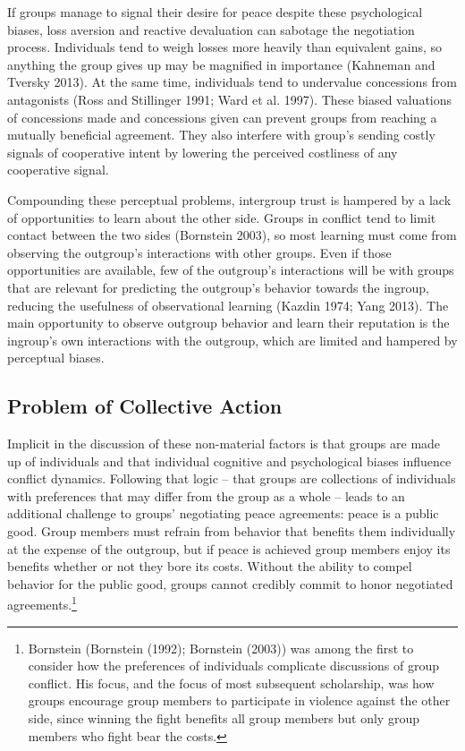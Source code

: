 \documentclass[11pt]{article}
\begin{document}
If groups manage to signal their desire for peace despite these
psychological biases, loss aversion and reactive devaluation can
sabotage the negotiation process. Individuals tend to weigh losses more
heavily than equivalent gains, so anything the group gives up may be
magnified in importance (Kahneman and Tversky 2013). At the same time,
individuals tend to undervalue concessions from antagonists (Ross and
Stillinger 1991; Ward et al. 1997). These biased valuations of
concessions made and concessions given can prevent groups from reaching
a mutually beneficial agreement. They also interfere with group's
sending costly signals of cooperative intent by lowering the perceived
costliness of any cooperative signal.

Compounding these perceptual problems, intergroup trust is hampered by a
lack of opportunities to learn about the other side. Groups in conflict
tend to limit contact between the two sides (Bornstein 2003), so most
learning must come from observing the outgroup's interactions with other
groups. Even if those opportunities are available, few of the outgroup's
interactions will be with groups that are relevant for predicting the
outgroup's behavior towards the ingroup, reducing the usefulness of
observational learning (Kazdin 1974; Yang 2013). The main opportunity to
observe outgroup behavior and learn their reputation is the ingroup's
own interactions with the outgroup, which are limited and hampered by
perceptual biases.

\hypertarget{problem-of-collective-action}{%
\subsection{Problem of Collective
Action}\label{problem-of-collective-action}}

Implicit in the discussion of these non-material factors is that groups
are made up of individuals and that individual cognitive and
psychological biases influence conflict dynamics. Following that logic
-- that groups are collections of individuals with preferences that may
differ from the group as a whole -- leads to an additional challenge to
groups' negotiating peace agreements: peace is a public good. Group
members must refrain from behavior that benefits them individually at
the expense of the outgroup, but if peace is achieved group members
enjoy its benefits whether or not they bore its costs. Without the
ability to compel behavior for the public good, groups cannot credibly
commit to honor negotiated agreements.\footnote{Bornstein (Bornstein
  (1992); Bornstein (2003)) was among the first to consider how the
  preferences of individuals complicate discussions of group conflict.
  His focus, and the focus of most subsequent scholarship, was how
  groups encourage group members to participate in violence against the
  other side, since winning the fight benefits all group members but
  only group members who fight bear the costs.}
\end{document}
